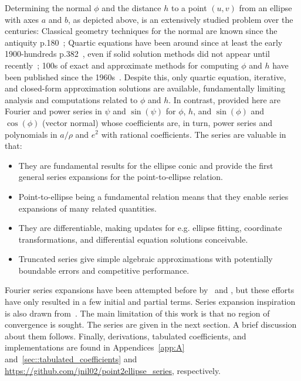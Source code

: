 \documentclass[a4paper]{amsart}
\begin{document}
\noindent
Determining the normal $\phi$ and the distance $h$ to a point $(u,v)$ from an ellipse with axes $a$ and $b$, as depicted above, is an extensively studied problem over the centuries:
%
Classical geometry techniques for the normal are known since the antiquity p.180~\cite{Heath1896};
%
Quartic equations
have been around since at least the early 1900-hundreds p.382~\cite{Gibson1911}, %
even if solid solution methods did not appear until recently~\cite{Vermeille2011};
%
100s of exact and approximate methods for computing $\phi$ and $h$ have been published since the 1960s~\cite{Nilsson2024}.
%
Despite this, only quartic equation, iterative, and closed-form approximation solutions are available, fundamentally limiting analysis and computations related to $\phi$ and $h$. 
%
In contrast, provided here are
Fourier and power series in $\psi$ and $\sin(\psi)$ for $\phi$, $h$, and $\sin(\phi)$ and $\cos(\phi)$ (vector normal) whose coefficients are, in turn, power series
and polynomials
in $a/\rho$ and $e^2$ with rational coefficients.
%
The series are valuable in that:
\begin{itemize}
\item They are fundamental results for the ellipse conic and provide the first general series expansions for the point-to-ellipse relation.
\item Point-to-ellipse being a fundamental relation means that they enable series expansions of many related quantities.
\item They are differentiable, making updates for e.g. ellipse fitting, coordinate transformations, and differential equation solutions conceivable.
\item Truncated series give simple algebraic approximations with potentially boundable errors and competitive performance.
\end{itemize}
Fourier series expansions have been attempted before by~\cite{Morrison1961} and \cite{Pick1967}, but these efforts have only resulted in a few initial and partial terms.
Series expansion inspiration is also drawn from~\cite{Nilsson2024minimax}.
%
The main limitation of this work is that no region of convergence is sought.
%
The series are given in the next section. A brief discussion about them follows.
%
Finally, derivations, tabulated coefficients, and implementations are found in Appendices~\ref{app:A} and~\ref{sec::tabulated_coefficients} and \url{https://github.com/jnil02/point2ellipse_series}, respectively.
\end{document}
